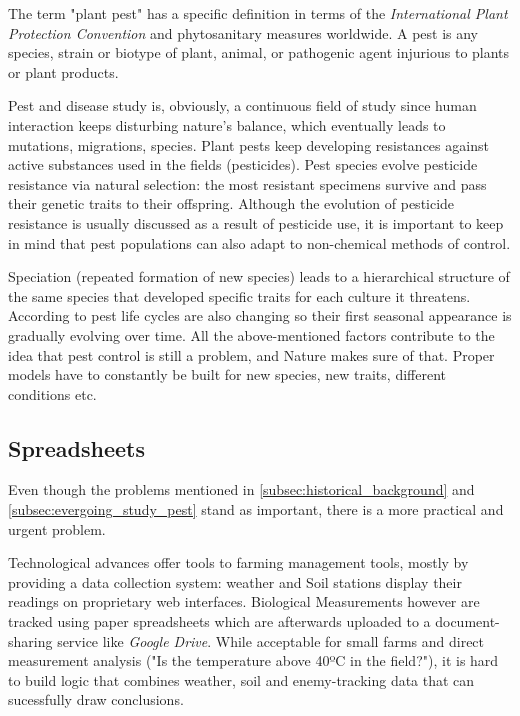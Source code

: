 The term "plant pest" has a specific definition in terms of the \textit{International Plant Protection Convention} and phytosanitary measures worldwide. A pest is any species, strain or biotype of plant, animal, or pathogenic agent injurious to plants or plant products. 

Pest and disease study is, obviously, a continuous field of study since human interaction keeps disturbing nature's balance, which eventually leads to mutations, migrations, species. Plant pests keep developing resistances against active substances used in the fields (pesticides). Pest species evolve pesticide resistance via natural selection: the most resistant specimens survive and pass their genetic traits to their offspring. Although the evolution of pesticide resistance is usually discussed as a result of pesticide use, it is important to keep in mind that pest populations can also adapt to non-chemical methods of control.

Speciation (repeated formation of new species) leads to a hierarchical structure of the same species that developed specific traits for each culture it threatens. According to \cite{Sharma2014} pest life cycles are also changing so their first seasonal appearance is gradually evolving over time. All the above-mentioned factors contribute to the idea that pest control is still a problem, and Nature makes sure of that. Proper models have to constantly be built for new species, new traits, different conditions etc. 


\subsection{Spreadsheets}

Even though the problems mentioned in \ref{subsec:historical_background} and \ref{subsec:evergoing_study_pest} stand as important, there is a more practical and urgent problem.

Technological advances offer tools to farming management tools, mostly by providing a data collection system: weather and Soil stations display their readings on proprietary web interfaces. Biological Measurements however are tracked using paper spreadsheets which are afterwards uploaded to a document-sharing service like \textit{Google Drive}. While acceptable for small farms and direct measurement analysis ("Is the temperature above 40ºC in the field?"), it is hard to build logic that combines weather, soil and enemy-tracking data that can sucessfully draw conclusions.

